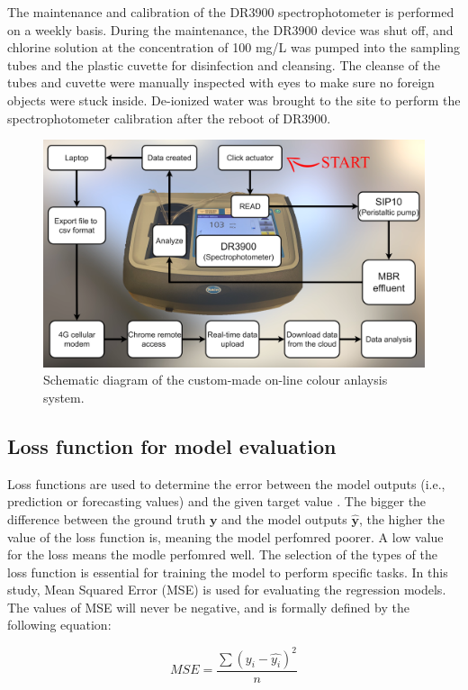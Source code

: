 The maintenance and calibration of the DR3900 spectrophotometer is performed on a weekly basis. During the maintenance, the DR3900 device was shut off, and chlorine solution at the concentration of 100 mg/L was pumped into the sampling tubes and the plastic cuvette for disinfection and cleansing. The cleanse of the tubes and cuvette were manually inspected with eyes to make sure no foreign objects were stuck inside. De-ionized water was brought to the site to perform the spectrophotometer calibration after the reboot of DR3900. 

\begin{figure}[h]
    \centering
    \includegraphics[width=0.8\columnwidth]{imgs/instrument/colour-sampler.png}
    \caption{Schematic diagram of the custom-made on-line colour anlaysis system.}
    \label{fig:diagram-colour-analysis}
 \end{figure}

\subsection{Loss function for model evaluation}
Loss functions are used to determine the error between the model outputs (i.e., prediction or forecasting values) and the given target value \citep{deepaiLossFunction2022}. The bigger the difference between the ground truth $\bm{y}$ and the model outputs $\bm{\hat{y}}$, the higher the value of the loss function is, meaning the model perfomred poorer. A low value for the loss means the modle perfomred well. The selection of the types of the loss function is essential for training the model to perform specific tasks. In this study, Mean Squared Error (MSE) is used for evaluating the regression models. The values of MSE will never be negative, and is formally defined by the following equation:

\begin{equation}\label{eq-mse}
    MSE=\frac{\sum (y_i-\hat{y_i})^2}{n}
\end{equation}

